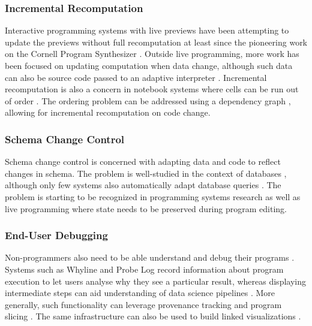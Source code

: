 \documentclass[sigconf]{acmart}
\begin{document}
\subsubsection*{Incremental Recomputation}
Interactive programming systems with live previews \cite{petricek-2020-live,mcdirmid-2013-usable}
have been attempting to update the previews without full recomputation at least since the pioneering
work on the Cornell Program Synthesizer \cite{teitelbaum-1981-cps}. Outside live programming,
more work has been focused on updating computation when data change, although such data can also
be source code passed to an adaptive interpreter \cite{acar-2006-adaptive}.
Incremental recomputation is also a concern in notebook systems where cells can be run out of
order \cite{singer-2020-jollity}. The ordering problem can be addressed using a dependency graph
\cite{petricek-2018-wrattler,koop-2017-dataflow}, allowing for incremental recomputation
on code change.

\subsubsection*{Schema Change Control}
Schema change control is concerned with adapting data and code to reflect changes in schema.
The problem is well-studied in the context of databases \cite{brahmia-2024-evolution},
although only few systems also automatically adapt database queries \cite{wang-2019-schema}.
The problem is starting to be recognized in programming systems research
\cite{litt-2020-cambria,edwards-2025-schema} as well as live programming \cite{barenz-2020-live}
where state needs to be preserved during program editing.

\subsubsection*{End-User Debugging}
Non-programmers also need to be able understand and debug their programs \cite{kissinger-2006-debugging}.
Systems such as Whyline and Probe Log \cite{ko-2004-whyline,ko-2009-whyline,krebs-2023-probelog}
record information about program execution to let users analyse why they see a particular result,
whereas displaying intermediate steps can aid understanding of data science pipelines \cite{shrestha-2021-unravel}.
More generally, such functionality can leverage provenance tracking \cite{cheney-2009-provenance}
and program slicing \cite{ricciotti-2017-imperative,perera-2012-functional}. The same infrastructure
can also be used to build linked visualizations \cite{perera-2022-linked}.
\end{document}
